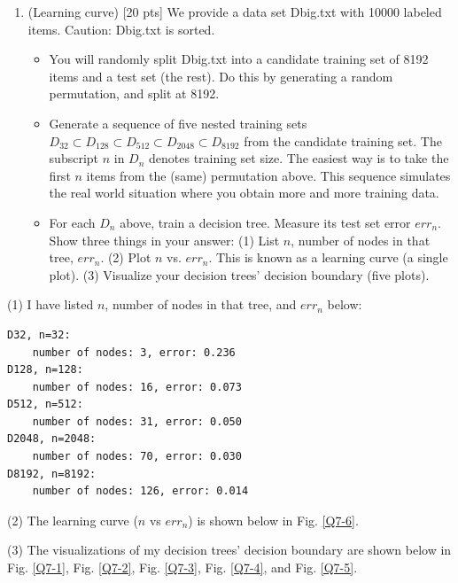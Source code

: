 \documentclass[a4paper]{article}
\theoremstyle{definition}
\begin{document}
\begin{enumerate}
\item (Learning curve)  [20 pts] We provide a data set Dbig.txt with 10000 labeled items.  Caution: Dbig.txt is sorted.
  \begin{itemize}
  
  \item You will randomly split Dbig.txt into a candidate training set of 8192 items and a test set (the rest).  Do this by generating a random permutation, and split at 8192.
  
  \item Generate a sequence of five nested training sets $D_{32} \subset D_{128} \subset D_{512} \subset D_{2048} \subset D_{8192}$ from the candidate training set.  The subscript $n$ in $D_n$ denotes training set size.  The easiest way is to take the first $n$ items from the (same) permutation above.  This sequence simulates the real world situation where you obtain more and more training data.
  
  \item For each $D_n$ above, train a decision tree.  Measure its test set error $err_n$.  Show three things in your answer: (1) List $n$, number of nodes in that tree, $err_n$. (2) Plot $n$ vs. $err_n$.  This is known as a learning curve (a single plot). (3) Visualize your decision trees' decision boundary (five plots). \\
  \end{itemize}
  
\end{enumerate}

{\color{blue}

(1) I have listed $n$, number of nodes in that tree, and $err_{n}$ below:

\begin{verbatim}
D32, n=32:
    number of nodes: 3, error: 0.236
D128, n=128:
    number of nodes: 16, error: 0.073
D512, n=512:
    number of nodes: 31, error: 0.050
D2048, n=2048:
    number of nodes: 70, error: 0.030
D8192, n=8192:
    number of nodes: 126, error: 0.014
\end{verbatim}

(2) The learning curve ($n$ vs $err_{n}$) is shown below in Fig. \ref{Q7-6}.

(3) The visualizations of my decision trees' decision boundary are shown below in Fig. \ref{Q7-1}, Fig. \ref{Q7-2}, Fig. \ref{Q7-3}, Fig. \ref{Q7-4}, and Fig. \ref{Q7-5}.
}
\end{document}
